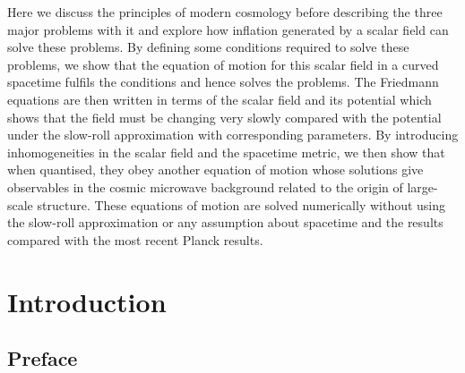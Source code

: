 \documentclass[a4paper,12pt,twoside]{report}
\begin{document}
\noindent Here we discuss the principles of modern cosmology before describing the three major problems with it and explore how inflation generated by a scalar field can solve these problems. By defining some conditions required to solve these problems, we show that the equation of motion for this scalar field in a curved spacetime fulfils the conditions and hence solves the problems. The Friedmann equations are then written in terms of the scalar field and its potential which shows that the field must be changing very slowly compared with the potential under the slow-roll approximation with corresponding parameters. By introducing inhomogeneities in the scalar field and the spacetime metric, we then show that when quantised, they obey another equation of motion whose solutions give observables in the cosmic microwave background related to the origin of large-scale structure. These equations of motion are solved numerically without using the slow-roll approximation or any assumption about spacetime and the results compared with the most recent Planck results.



\newpage
{}
\tableofcontents
\listoffigures
{}
{}


\newpage




% 

\chapter{Introduction}
\label{chap:intro}

\section{Preface} \label{sec:Preface}
\end{document}

